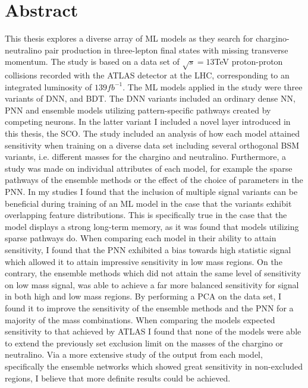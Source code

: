 \chapter*{Abstract} 
This thesis explores a diverse array of \acf{ML} models as they search for chargino-neutralino pair production in 
three-lepton final states with missing transverse momentum. The study is based on a data set of $\sqrt{s} = 13$TeV proton-proton
collisions recorded with the \acs{ATLAS} detector at the \acs{LHC}, corresponding to an integrated luminosity of $139 fb^{-1}$. The \acs{ML} 
models applied in the study were three variants of \acf{DNN}, and \acf{BDT}. The \acs{DNN} variants included an ordinary 
dense \acf{NN}, \acf{PNN} and ensemble models utilizing pattern-specific pathways created by competing neurons. In the latter variant I 
included a novel layer introduced in this thesis, the \acf{SCO}. The study included an analysis of how each model attained sensitivity 
when training on a diverse data set including several orthogonal \acf{BSM} variants, i.e. different masses for the chargino and neutralino. 
Furthermore, a study was made on individual attributes of each model, for example the sparse pathways of the ensemble methods or the effect 
of the choice of parameters in the \acs{PNN}. In my studies I found that the inclusion of multiple signal variants can be beneficial during 
training of an \ac{ML} model in the case that the variants exhibit overlapping feature distributions. This is specifically true in 
the case that the model displays a strong long-term memory, as it was found that models utilizing sparse pathways do. When comparing each 
model in their ability to attain sensitivity, I found that the \acs{PNN} exhibited a bias towards high statistic signal which allowed it 
to attain impressive sensitivity in low mass regions. On the contrary, the ensemble methods which did not attain the same level of sensitivity 
on low mass signal, was able to achieve a far more balanced sensitivity for signal in both high and low mass regions. By performing 
a \acf{PCA} on the data set, I found it to improve the sensitivity of the ensemble methods and the \ac{PNN} for a majority of the mass combinations.
When comparing the models expected sensitivity to that achieved by \acs{ATLAS} I found that none of the models were able to extend the previously set 
exclusion limit on the masses of the chargino or neutralino. Via a more extensive study of the output from each model, specifically the ensemble networks which showed great sensitivity in non-excluded 
regions, I believe that more definite results could be achieved. 
